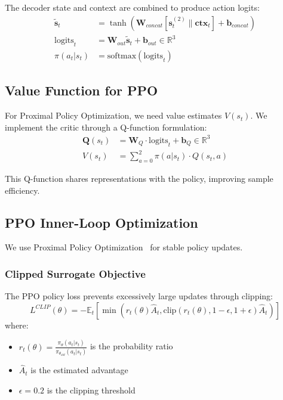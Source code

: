 \documentclass[journal,twoside]{IEEEtran}
\newcommand{\R}{\mathbb{R}}
\newcommand{\E}{\mathbb{E}}
\begin{document}
The decoder state and context are combined to produce action logits:
\begin{align}
\tilde{\mathbf{s}}_t &= \tanh\left( \mathbf{W}_{concat} \left[ \mathbf{s}_t^{(2)} \| \mathbf{ctx}_t \right] + \mathbf{b}_{concat} \right) \\
\text{logits}_t &= \mathbf{W}_{out} \tilde{\mathbf{s}}_t + \mathbf{b}_{out} \in \R^3 \\
\pi(a_t | s_t) &= \text{softmax}(\text{logits}_t)
\end{align}

\subsection{Value Function for PPO}

For Proximal Policy Optimization, we need value estimates $V(s_t)$. We implement the critic through a Q-function formulation:
\begin{align}
\mathbf{Q}(s_t) &= \mathbf{W}_Q \cdot \text{logits}_t + \mathbf{b}_Q \in \R^3 \\
V(s_t) &= \sum_{a=0}^{2} \pi(a | s_t) \cdot Q(s_t, a)
\end{align}

This Q-function shares representations with the policy, improving sample efficiency.

\subsection{PPO Inner-Loop Optimization}

We use Proximal Policy Optimization~\cite{schulman2017proximal} for stable policy updates.

\subsubsection{Clipped Surrogate Objective}

The PPO policy loss prevents excessively large updates through clipping:
\begin{equation}
L^{CLIP}(\theta) = -\E_t\left[ \min\left( r_t(\theta) \hat{A}_t, \text{clip}(r_t(\theta), 1-\epsilon, 1+\epsilon) \hat{A}_t \right) \right]
\label{eq:ppo_clip}
\end{equation}
where:
\begin{itemize}
    \item $r_t(\theta) = \frac{\pi_\theta(a_t | s_t)}{\pi_{\theta_{old}}(a_t | s_t)}$ is the probability ratio
    \item $\hat{A}_t$ is the estimated advantage
    \item $\epsilon = 0.2$ is the clipping threshold
\end{itemize}
\end{document}
